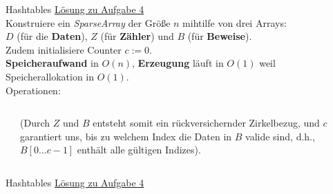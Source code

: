 \begin{frame}{Hashtables}
	\underline{Lösung zu Aufgabe 4}
	\\
	Konstruiere ein \emph{SparseArray} der Größe $n$ mihtilfe von drei Arrays: \\ 
	$D$ (für die \textbf{Daten}), $Z$ (für \textbf{Zähler}) und $B$ (für \textbf{Beweise}). \\ 
	Zudem initialisiere Counter $c := 0$. \\ 
	\impl \textbf{Speicheraufwand} in $O(n)$, \textbf{Erzeugung} läuft in $O(1)$ weil Speicherallokation in $O(1)$. \\
	Operationen: \\
	\pause
	\begin{columns}[c]
		\begin{algorithm}[H]
		\end{algorithm}
		\forcenewline
			(Durch $Z$ und $B$ entsteht somit ein rückversichernder Zirkelbezug, und $c$ garantiert uns, bis zu welchem Index die Daten in $B$ valide sind, d.h., $B[0...c-1]$ enthält alle gültigen Indizes).
	\end{columns}
	
	
\end{frame}

\begin{frame}{Hashtables}
	\underline{Lösung zu Aufgabe 4}
	\\
	\begin{algorithm}[H]
		\;
		\pause
		\;
	\end{algorithm}
\end{frame}

	

